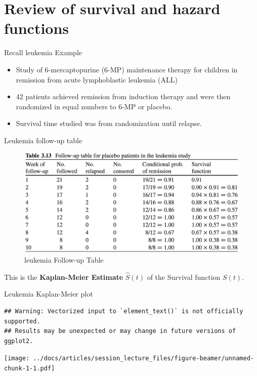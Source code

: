 \documentclass[
  ignorenonframetext,
]{beamer}
\providecommand{\tightlist}{%
  \setlength{\itemsep}{0pt}\setlength{\parskip}{0pt}}
\begin{document}
\hypertarget{review-of-survival-and-hazard-functions}{%
\section{Review of survival and hazard
functions}\label{review-of-survival-and-hazard-functions}}

\begin{frame}{Recall leukemia Example}
\protect\hypertarget{recall-leukemia-example}{}

\begin{itemize}
\tightlist
\item
  Study of 6-mercaptopurine (6-MP) maintenance therapy for children in
  remission from acute lymphoblastic leukemia (ALL)
\item
  42 patients achieved remission from induction therapy and were then
  randomized in equal numbers to 6-MP or placebo.
\item
  Survival time studied was from randomization until relapse.
\end{itemize}

\end{frame}

\begin{frame}{Leukemia follow-up table}
\protect\hypertarget{leukemia-follow-up-table}{}

\begin{figure}
\centering
\includegraphics{figures/leukemiatable.png}
\caption{leukemia Follow-up Table}
\end{figure}

This is the \textbf{Kaplan-Meier Estimate} \(\hat S(t)\) of the Survival
function \(S(t)\).

\end{frame}

\begin{frame}[fragile]{Leukemia Kaplan-Meier plot}
\protect\hypertarget{leukemia-kaplan-meier-plot}{}

\begin{verbatim}
## Warning: Vectorized input to `element_text()` is not officially supported.
## Results may be unexpected or may change in future versions of ggplot2.
\end{verbatim}

\texttt{[image: ../docs/articles/session\_lecture\_files/figure-beamer/unnamed-chunk-1-1.pdf]}

\end{frame}
\end{document}
